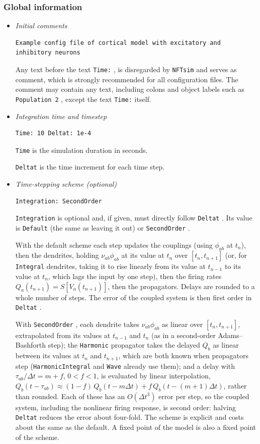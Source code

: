 \documentclass[12pt,a4paper]{article}
\newcommand{\type}[1]{{\small\small\tt #1} }
\newcommand{\NF}[0]{\type{NFTsim}}
\begin{document}
\clearpage


\subsubsection{Global information}
\label{sec:global}

\begin{itemize}
\item {\em Initial comments}
\begin{lstlisting}
Example config file of cortical model with excitatory and inhibitory neurons
\end{lstlisting}
Any text before the text \type{Time:}, is disregarded by \NF and serves as comment, which is strongly recommended for all configuration files.
The comment may contain any text, including colons and object labels such as \type{Population 2}, except the text \type{Time:} itself.
\item  {\em Integration time and timestep}
\begin{lstlisting}
Time: 10 Deltat: 1e-4
\end{lstlisting}
\type{Time} is the simulation duration in seconds.

\type{Deltat} is the time increment for each time step.
\item  {\em Time-stepping scheme (optional)}
\begin{lstlisting}
Integration: SecondOrder
\end{lstlisting}
\type{Integration} is optional and, if given, must directly follow \type{Deltat}. Its value is \type{Default} (the same as leaving it out) or \type{SecondOrder}.

With the default scheme each step updates the couplings (using $\phi_{ab}$ at $t_n$), then the dendrites, holding $\nu_{ab}\phi_{ab}$ at its value at $t_n$ over $[t_n, t_{n+1}]$ (or, for \type{Integral} dendrites, taking it to rise linearly from its value at $t_{n-1}$ to its value at $t_n$, which lags the input by one step), then the firing rates $Q_a(t_{n+1}) = S[V_a(t_{n+1})]$, then the propagators. Delays are rounded to a whole number of steps. The error of the coupled system is then first order in \type{Deltat}.

With \type{SecondOrder}, each dendrite takes $\nu_{ab}\phi_{ab}$ as linear over $[t_n, t_{n+1}]$, extrapolated from its values at $t_{n-1}$ and $t_n$ (as in a second-order Adams--Bashforth step); the \type{Harmonic} propagator takes the delayed $Q_b$ as linear between its values at $t_n$ and $t_{n+1}$, which are both known when propagators step (\type{HarmonicIntegral} and \type{Wave} already use them); and a delay with $\tau_{ab}/\Delta t = m + f$, $0 < f < 1$, is evaluated by linear interpolation, $Q_b(t - \tau_{ab}) \approx (1-f)\,Q_b(t - m\Delta t) + f\,Q_b(t - (m+1)\Delta t)$, rather than rounded. Each of these has an $O(\Delta t^3)$ error per step, so the coupled system, including the nonlinear firing response, is second order: halving \type{Deltat} reduces the error about four-fold. The scheme is explicit and costs about the same as the default. A fixed point of the model is also a fixed point of the scheme.


\end{itemize}
\end{document}
